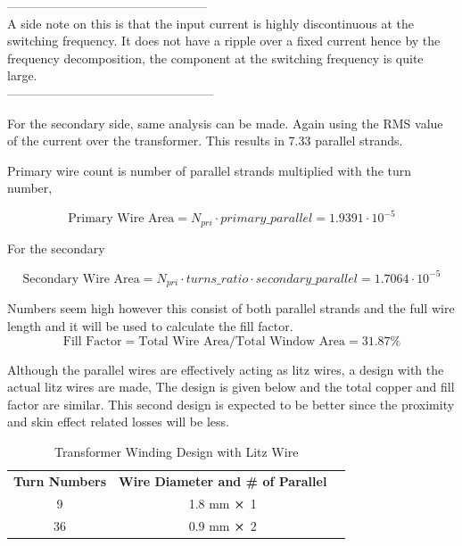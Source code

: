 \documentclass[12pt]{article}
\begin{document}
    \centering
    ------------------------------------------------ \\
    A side note on this is that the input current is highly discontinuous at the switching frequency. It does not have a ripple over a fixed current hence by the frequency decomposition, the component at the switching frequency is quite large. \\
    -------------------------------------------------- \\
    \raggedright
    
    For the secondary side, same analysis can be made. Again using the RMS value of the current over the transformer. This results in 7.33 parallel strands.

    Primary wire count is number of parallel strands multiplied with the turn number,

    \begin{equation*}
        \textrm{Primary Wire Area} = N_{pri} \cdot primary\_parallel = 1.9391\cdot 10^{-5}
    \end{equation*}

    For the secondary

    \begin{equation*}
        \textrm{Secondary Wire Area} = N_{pri} \cdot turns\_ratio \cdot secondary\_parallel = 1.7064\cdot 10^{-5}
    \end{equation*}

    Numbers seem high however this consist of both parallel strands and the full wire length and it will be used to calculate the fill factor.
    \begin{equation*}
        \textrm{Fill Factor} = \textrm{Total Wire Area} / \textrm{Total Window Area} =   31.87 \%
    \end{equation*}

    Although the parallel wires are effectively acting as litz wires, a design with the actual litz wires are made, The design is given below and the total copper and fill factor are similar. This second design is expected to be better since the proximity and skin effect related losses will be less.

    \begin{table}[H]
        \centering
        \begin{tabular}{|c|c|l}
        \cline{1-2}
        \textbf{Turn Numbers} & \textbf{Wire Diameter and \# of Parallel} &  \\ \cline{1-2}
        9                         & 1.8 mm $\cross$ 1                                &  \\ \cline{1-2}
        36                         & 0.9 mm $\cross$ 2                                  &  \\ \cline{1-2}
        \end{tabular}
        \caption{Transformer Winding Design with Litz Wire}
        \label{tab:DCM}
    \end{table}
\end{document}
